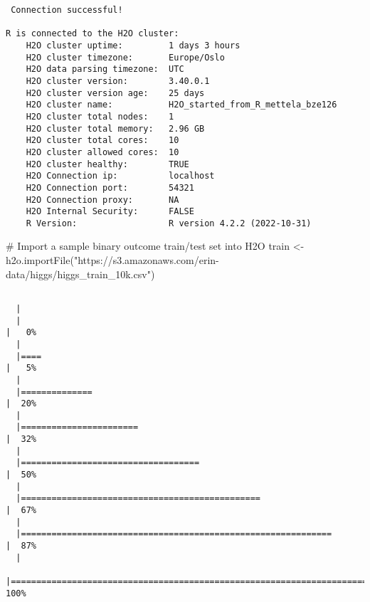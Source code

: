 \documentclass[
  letterpaper,
  DIV=11,
  numbers=noendperiod]{scrartcl}
\newenvironment{Shaded}{\begin{snugshade}}{\end{snugshade}}
\newcommand{\CommentTok}[1]{\textcolor[rgb]{0.37,0.37,0.37}{#1}}
\newcommand{\FunctionTok}[1]{\textcolor[rgb]{0.28,0.35,0.67}{#1}}
\newcommand{\NormalTok}[1]{\textcolor[rgb]{0.00,0.23,0.31}{#1}}
\newcommand{\OtherTok}[1]{\textcolor[rgb]{0.00,0.23,0.31}{#1}}
\newcommand{\StringTok}[1]{\textcolor[rgb]{0.13,0.47,0.30}{#1}}
\begin{document}
\begin{verbatim}
 Connection successful!

R is connected to the H2O cluster: 
    H2O cluster uptime:         1 days 3 hours 
    H2O cluster timezone:       Europe/Oslo 
    H2O data parsing timezone:  UTC 
    H2O cluster version:        3.40.0.1 
    H2O cluster version age:    25 days 
    H2O cluster name:           H2O_started_from_R_mettela_bze126 
    H2O cluster total nodes:    1 
    H2O cluster total memory:   2.96 GB 
    H2O cluster total cores:    10 
    H2O cluster allowed cores:  10 
    H2O cluster healthy:        TRUE 
    H2O Connection ip:          localhost 
    H2O Connection port:        54321 
    H2O Connection proxy:       NA 
    H2O Internal Security:      FALSE 
    R Version:                  R version 4.2.2 (2022-10-31) 
\end{verbatim}

\begin{Shaded}
\begin{Highlighting}[]
\CommentTok{\# Import a sample binary outcome train/test set into H2O}
\NormalTok{train }\OtherTok{\textless{}{-}} \FunctionTok{h2o.importFile}\NormalTok{(}\StringTok{"https://s3.amazonaws.com/erin{-}data/higgs/higgs\_train\_10k.csv"}\NormalTok{)}
\end{Highlighting}
\end{Shaded}

\begin{verbatim}

  |                                                                            
  |                                                                      |   0%
  |                                                                            
  |====                                                                  |   5%
  |                                                                            
  |==============                                                        |  20%
  |                                                                            
  |=======================                                               |  32%
  |                                                                            
  |===================================                                   |  50%
  |                                                                            
  |===============================================                       |  67%
  |                                                                            
  |=============================================================         |  87%
  |                                                                            
  |======================================================================| 100%
\end{verbatim}
\end{document}
